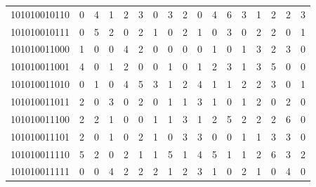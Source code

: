 \documentclass[10pt,a4paper]{article}
\begin{document}
\begin{longtable}{ |c|c|c|c|c|c|c|c|c|c|c|c|c|c|c|c|c| }
    101010010110              & 0                            & 4                                & 1                            & 2                              & 3   & 0   & 3   & 2   & 0   & 4   & 6   & 3   & 1   & 2   & 2   & 3   \\
    101010010111              & 0                            & 5                                & 2                            & 0                              & 2   & 1   & 0   & 2   & 1   & 0   & 3   & 0   & 2   & 2   & 0   & 1   \\
    101010011000              & 1                            & 0                                & 0                            & 4                              & 2   & 0   & 0   & 0   & 0   & 1   & 0   & 1   & 3   & 2   & 3   & 0   \\
    101010011001              & 4                            & 0                                & 1                            & 2                              & 0   & 0   & 1   & 0   & 1   & 2   & 3   & 1   & 3   & 5   & 0   & 0   \\
    101010011010              & 0                            & 1                                & 0                            & 4                              & 5   & 3   & 1   & 2   & 4   & 1   & 1   & 2   & 2   & 3   & 0   & 1   \\
    101010011011              & 2                            & 0                                & 3                            & 0                              & 2   & 0   & 1   & 1   & 3   & 1   & 0   & 1   & 2   & 0   & 2   & 0   \\
    101010011100              & 2                            & 2                                & 1                            & 0                              & 0   & 1   & 1   & 3   & 1   & 2   & 5   & 2   & 2   & 2   & 6   & 0   \\
    101010011101              & 2                            & 0                                & 1                            & 0                              & 2   & 1   & 0   & 3   & 3   & 0   & 0   & 1   & 1   & 3   & 3   & 0   \\
    101010011110              & 5                            & 2                                & 0                            & 2                              & 1   & 1   & 5   & 1   & 4   & 5   & 1   & 1   & 2   & 6   & 3   & 2   \\
    101010011111              & 0                            & 0                                & 4                            & 2                              & 2   & 2   & 1   & 2   & 3   & 1   & 0   & 2   & 1   & 0   & 4   & 0   \\

\end{longtable}
\end{document}

